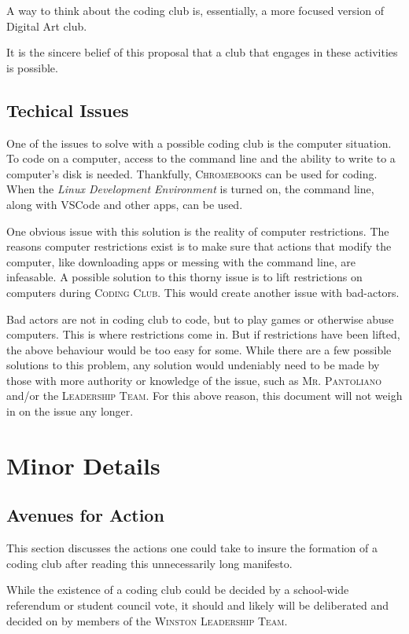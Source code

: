 \documentclass{report}
\begin{document}
A way to think about the coding club is, essentially, a more focused version of Digital Art club.

It is the sincere belief of this proposal that a club that engages in these activities is possible.

\subsection{Techical Issues}

One of the issues to solve with a possible coding club is the computer situation. To code on a computer, access to the command line and the ability to write to a computer's disk is needed. Thankfully, \textsc{Chromebooks} can be used for coding. When the \textit{Linux Development Environment} is turned on, the command line, along with VSCode and other apps, can be used.

One obvious issue with this solution is the reality of computer restrictions. The reasons computer restrictions exist is to make sure that actions that modify the computer, like downloading apps or messing with the command line, are infeasable. A possible solution to this thorny issue is to lift restrictions on computers during \textsc{Coding Club}. This would create another issue with bad-actors.

Bad actors are not in coding club to code, but to play games or otherwise abuse computers. This is where restrictions come in. But if restrictions have been lifted, the above behaviour would be too easy for some. While there are a few possible solutions to this problem, any solution would undeniably need to be made by those with more authority or knowledge of the issue, such as \textsc{Mr. Pantoliano} and/or the \textsc{Leadership Team}. For this above reason, this document will not weigh in on the issue any longer.

\section{Minor Details}

\subsection{Avenues for Action}

This section discusses the actions one could take to insure the formation of a coding club after reading this unnecessarily long manifesto.

While the existence of a coding club could be decided by a school-wide referendum or student council vote, it should and likely will be deliberated and decided on by members of the \textsc{Winston Leadership Team}.
\end{document}
